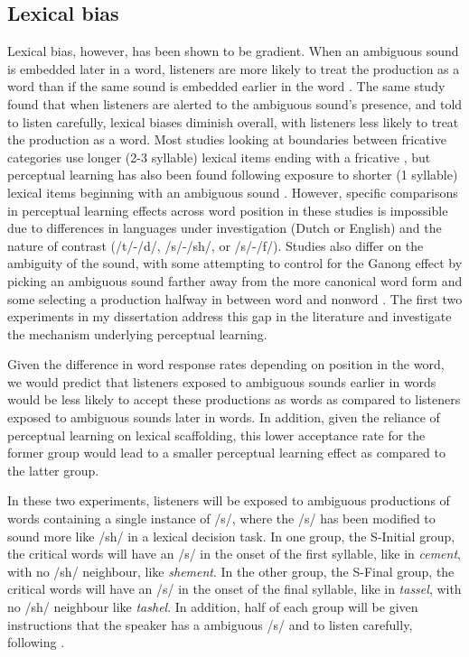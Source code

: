 \subsection{Lexical bias}

Lexical bias, however, has been shown to be gradient.  When an ambiguous sound is embedded later in a word, listeners are more likely to treat the production as a word than if the same sound is embedded earlier in the word \citep{Pitt2012}.  The same study found that when listeners are alerted to the ambiguous sound's presence, and told to listen carefully, lexical biases diminish overall, with listeners less likely to treat the production as a word.    Most studies looking at boundaries between fricative categories use longer (2-3 syllable) lexical items ending with a fricative \citep{Norris2003}, but perceptual learning has also been found following exposure to shorter (1 syllable) lexical items beginning with an ambiguous sound \citep{Clare2014}.  However, specific comparisons in perceptual learning effects across word position in these studies is impossible due to differences in languages under investigation (Dutch or English) and the nature of contrast (/t/-/d/, /s/-/sh/, or /s/-/f/). Studies also differ on the ambiguity of the sound, with some attempting to control for the Ganong effect by picking an ambiguous sound farther away from the more canonical word form \citep{Reinisch2013} and some selecting a production halfway in between word and nonword \citep{Norris2003}.  The first two experiments in my dissertation address this gap in the literature and investigate the mechanism underlying perceptual learning.

Given the difference in word response rates depending on position in the word, we would predict that listeners exposed to ambiguous sounds earlier in words would be less likely to accept these productions as words as compared to listeners exposed to ambiguous sounds later in words.  In addition, given the reliance of perceptual learning on lexical scaffolding, this lower acceptance rate for the former group would lead to a smaller perceptual learning effect as compared to the latter group.

In these two experiments, listeners will be exposed to ambiguous productions of words containing a single instance of /s/, where the /s/ has been modified to sound more like /sh/ in a lexical decision task.  In one group, the S-Initial group, the critical words will have an /s/ in the onset of the first syllable, like in \emph{cement}, with no /sh/ neighbour, like \emph{shement}.  In the other group, the S-Final group, the critical words will have an /s/ in the onset of the final syllable, like in \emph{tassel}, with no /sh/ neighbour like \emph{tashel}.  In addition, half of each group will be given instructions that the speaker has a ambiguous /s/ and to listen carefully, following \citet{Pitt2012}.

